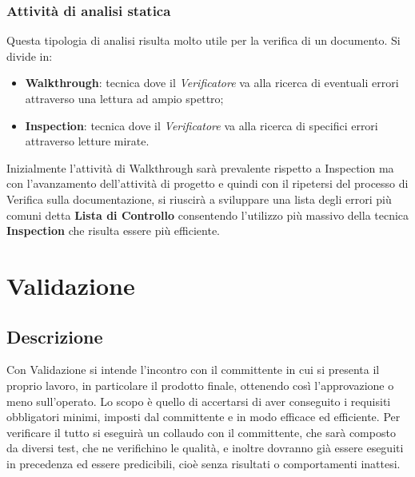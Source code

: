 \subsubsection{Attività di analisi statica}
Questa tipologia di analisi risulta molto utile per la verifica di un documento. Si divide in:
\begin{itemize}
  \item \textbf{Walkthrough}: tecnica dove il \textit{Verificatore} va alla ricerca di eventuali errori attraverso una lettura ad ampio spettro;
  \item \textbf{Inspection}: tecnica dove il \textit{Verificatore} va alla ricerca di specifici errori attraverso letture mirate.
\end{itemize}
Inizialmente l'attività di Walkthrough sarà prevalente rispetto a Inspection ma
con l'avanzamento dell'attività di progetto e quindi con il ripetersi del processo di Verifica sulla documentazione, si riuscirà a sviluppare una lista degli errori più comuni detta \textbf{Lista di Controllo} consentendo l'utilizzo più massivo della tecnica \textbf{Inspection} che risulta essere più efficiente.

\section{Validazione}
\subsection{Descrizione}
Con Validazione si intende l'incontro con il committente in cui si presenta il proprio lavoro, in particolare il
prodotto finale, ottenendo così l'approvazione o meno sull'operato. \newline
Lo scopo è quello di accertarsi di aver conseguito i requisiti obbligatori minimi, imposti dal committente e
in modo efficace ed efficiente. Per verificare il tutto si eseguirà un collaudo con il committente, che sarà composto
da diversi test, che ne verifichino le qualità, e inoltre dovranno già essere eseguiti in precedenza ed essere
predicibili, cioè senza risultati o comportamenti inattesi.
